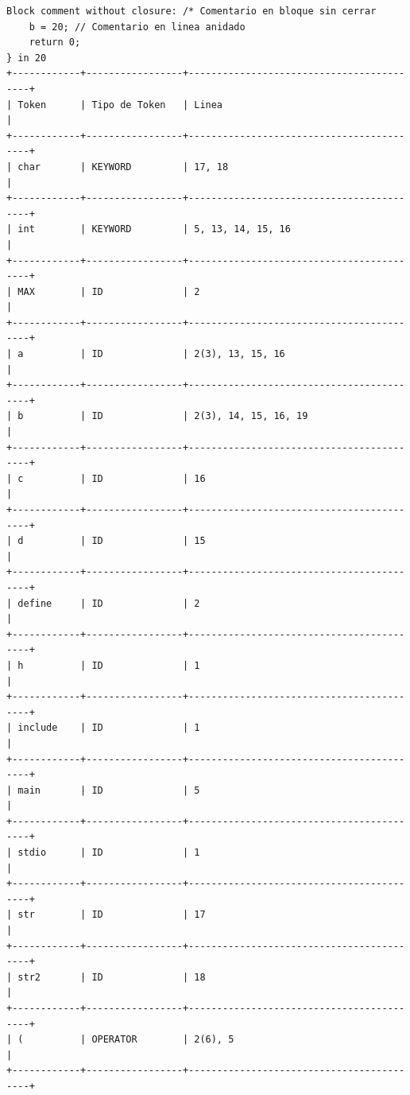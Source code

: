 \documentclass[a4paper,12pt]{article}
\begin{document}
\begin{flushleft}
\begin{verbatim}
Block comment without closure: /* Comentario en bloque sin cerrar
    b = 20; // Comentario en linea anidado
    return 0;
} in 20
+------------+-----------------+------------------------------------------+
| Token      | Tipo de Token   | Linea                                    |
+------------+-----------------+------------------------------------------+
| char       | KEYWORD         | 17, 18                                   |
+------------+-----------------+------------------------------------------+
| int        | KEYWORD         | 5, 13, 14, 15, 16                        |
+------------+-----------------+------------------------------------------+
| MAX        | ID              | 2                                        |
+------------+-----------------+------------------------------------------+
| a          | ID              | 2(3), 13, 15, 16                         |
+------------+-----------------+------------------------------------------+
| b          | ID              | 2(3), 14, 15, 16, 19                     |
+------------+-----------------+------------------------------------------+
| c          | ID              | 16                                       |
+------------+-----------------+------------------------------------------+
| d          | ID              | 15                                       |
+------------+-----------------+------------------------------------------+
| define     | ID              | 2                                        |
+------------+-----------------+------------------------------------------+
| h          | ID              | 1                                        |
+------------+-----------------+------------------------------------------+
| include    | ID              | 1                                        |
+------------+-----------------+------------------------------------------+
| main       | ID              | 5                                        |
+------------+-----------------+------------------------------------------+
| stdio      | ID              | 1                                        |
+------------+-----------------+------------------------------------------+
| str        | ID              | 17                                       |
+------------+-----------------+------------------------------------------+
| str2       | ID              | 18                                       |
+------------+-----------------+------------------------------------------+
| (          | OPERATOR        | 2(6), 5                                  |
+------------+-----------------+------------------------------------------+

\end{verbatim}
\end{flushleft}
\end{document}
